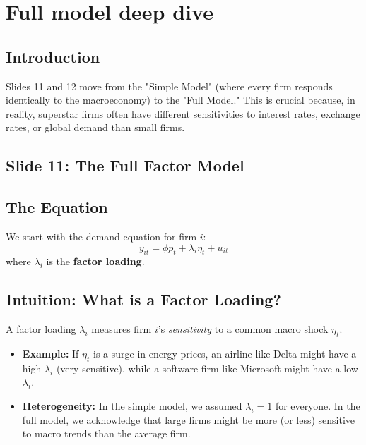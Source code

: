 \documentclass[12pt]{article}
\begin{document}

\section{Full model deep dive}

\subsection{Introduction}
Slides 11 and 12 move from the "Simple Model" (where every firm responds identically to the macroeconomy) to the "Full Model." This is crucial because, in reality, superstar firms often have different sensitivities to interest rates, exchange rates, or global demand than small firms.

\subsection{Slide 11: The Full Factor Model}

\subsection{The Equation}
We start with the demand equation for firm $i$:
\begin{equation}
    y_{it} = \phi p_t + \lambda_i \eta_t + u_{it} \label{eq:full}
\end{equation}
where $\lambda_i$ is the \textbf{factor loading}.

\subsection{Intuition: What is a Factor Loading?}
A factor loading $\lambda_i$ measures firm $i$'s \textit{sensitivity} to a common macro shock $\eta_t$.
\begin{itemize}
    \item \textbf{Example:} If $\eta_t$ is a surge in energy prices, an airline like Delta might have a high $\lambda_i$ (very sensitive), while a software firm like Microsoft might have a low $\lambda_i$.
    \item \textbf{Heterogeneity:} In the simple model, we assumed $\lambda_i = 1$ for everyone. In the full model, we acknowledge that large firms might be more (or less) sensitive to macro trends than the average firm.
\end{itemize}
\end{document}
